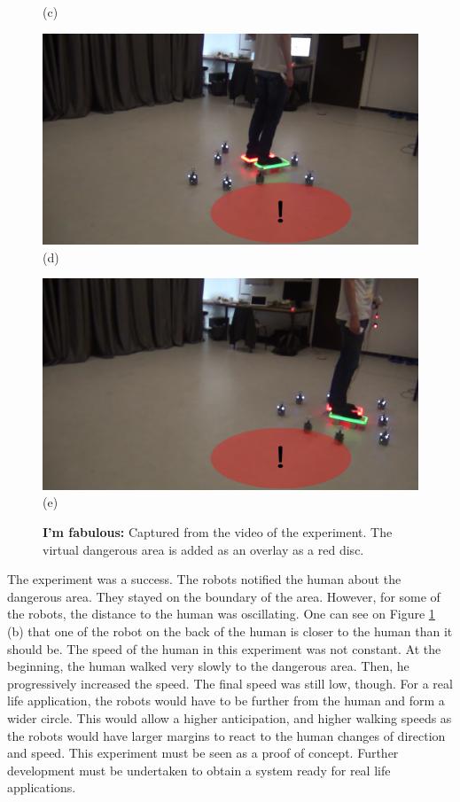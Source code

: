 \documentclass[oneside, a4paper, 12pt]{memoir}
\let\oldCaption\caption
\renewcommand{\caption}[2]{
\oldCaption[#1]{{\small\sffamily\bfseries #1:} #2}
}
\begin{document}
\begin{figure}[!htp]
\begin{minipage}[c]{0.49\textwidth}
					\centering (c)
				\end{minipage}
				\hfill
				\begin{minipage}[c]{0.49\textwidth}
					\includegraphics[width=\textwidth]{images/vlcsnap-00005.jpg}
					\centering (d)
				\end{minipage}
				\begin{minipage}[c]{0.49\textwidth}
					\includegraphics[width=\textwidth]{images/vlcsnap-00007.jpg}
					\centering (e)
				\end{minipage}
				
				
				\caption{I'm fabulous}{Captured from the video of the experiment. The virtual dangerous area is added as an overlay as a red disc.}
				\label{fig:demo_pictures}
			\end{figure}
			
			The experiment was a success. The robots notified the human about the dangerous area. They stayed on the boundary of the area. However, for some of the robots, the distance to the human was oscillating. One can see on Figure \ref{fig:demo_pictures} (b) that one of the robot on the back of the human is closer to the human than it should be. The speed of the human in this experiment was not constant. At the beginning, the human walked very slowly to the dangerous area. Then, he progressively increased the speed. The final speed was still low, though. For a real life application, the robots would have to be further from the human and form a wider circle. This would allow a higher anticipation, and higher walking speeds as the robots would have larger margins to react to the human changes of direction and speed. This experiment must be seen as a proof of concept. Further development must be undertaken to obtain a system ready for real life applications.
	
\end{document}

